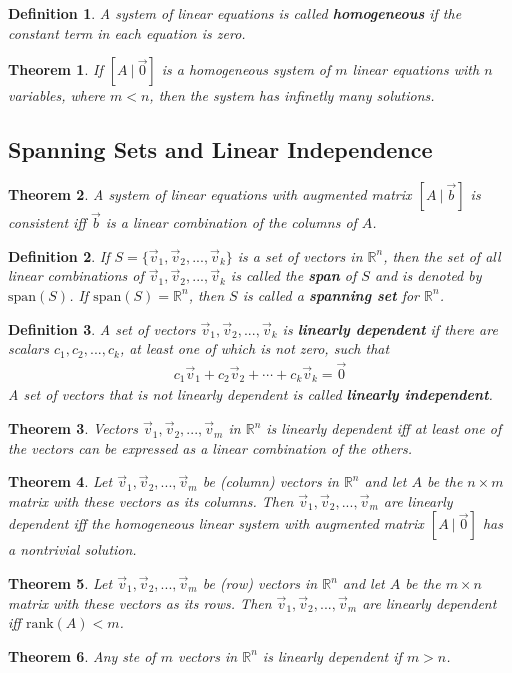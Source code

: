 \documentclass{article}
\theoremstyle{sltheorem}
\newtheorem{definition}{Definition}[section]
\newtheorem{theorem}{Theorem}[section]
\begin{document}
\begin{definition}
    A system of linear equations is called \textbf{homogeneous} if the constant term in each equation is zero.
\end{definition}
\begin{theorem}
    If $[A\:|\:\vec 0]$ is a homogeneous system of $m$ linear equations with $n$ variables, where $m < n$, then the system has infinetly many solutions.
\end{theorem}
\subsection{Spanning Sets and Linear Independence}
\begin{theorem}
    A system of linear equations with augmented matrix $[A\:|\:\vec b]$ is consistent iff $\vec b$ is a linear combination of the columns of $A$.
\end{theorem}
\begin{definition}
    If $S=\{\vec v_1, \vec v_2, ..., \vec v_k\}$ is a set of vectors in $\mathbb{R}^n$, then the set of all linear combinations of $\vec v_1, \vec v_2, ..., \vec v_k$ is called the \textbf{span} of $S$ and is denoted by $\text{span}(S)$. If $\text{span}(S)=\mathbb{R}^n$, then $S$ is called a \textbf{spanning set} for $\mathbb{R}^n$.
\end{definition}
\begin{definition}
    A set of vectors $\vec v_1, \vec v_2, ..., \vec v_k$ is \textbf{linearly dependent} if there are scalars $c_1, c_2, ..., c_k$, at least one of which is not zero, such that
    \begin{gather*}
        c_1\vec v_1 + c_2\vec v_2 + \cdots + c_k\vec v_k = \vec 0
    \end{gather*}
    A set of vectors that is not linearly dependent is called \textbf{linearly independent}.
\end{definition}
\begin{theorem}
    Vectors $\vec v_1, \vec v_2, ..., \vec v_m$ in $\mathbb{R}^n$ is linearly dependent iff at least one of the vectors can be expressed as a linear combination of the others.
\end{theorem}
\begin{theorem}
    Let $\vec v_1, \vec v_2, ..., \vec v_m$ be (column) vectors in $\mathbb{R}^n$ and let $A$ be the $n\times m$ matrix with these vectors as its columns. Then $\vec v_1, \vec v_2, ..., \vec v_m$ are linearly dependent iff the homogeneous linear system with augmented matrix $[A\:|\:\vec 0]$ has a nontrivial solution.
\end{theorem}
\begin{theorem}
    Let $\vec v_1, \vec v_2, ..., \vec v_m$ be (row) vectors in $\mathbb{R}^n$ and let $A$ be the $m\times n$ matrix with these vectors as its rows. Then $\vec v_1, \vec v_2, ..., \vec v_m$ are linearly dependent iff $\text{rank}(A) < m$.
\end{theorem}
\begin{theorem}
    Any ste of $m$ vectors in $\mathbb{R}^n$ is linearly dependent if $m > n$.
\end{theorem}
\end{document}
